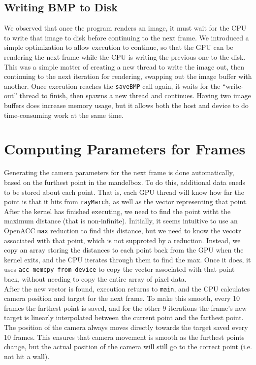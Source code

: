 \documentclass[11pt]{article}
\begin{document}
\subsection{Writing BMP to Disk}
We observed that once the program renders an image, it must wait for the CPU to write that image to disk before continuing to the next frame. We introduced a simple optimization to allow execution to continue, so that the GPU can be rendering the next frame while the CPU is writing the previous one to the disk. This was a simple matter of creating a new thread to write the image out, then continuing to the next iteration for rendering, swapping out the image buffer with another. Once execution reaches the \texttt{saveBMP} call again, it waits for the ``write-out'' thread to finish, then spawns a new thread and continues. Having two image buffers does increase memory usage, but it allows both the host and device to do time-consuming work at the same time.

\section{Computing Parameters for Frames}\label{Sec_AutomaticNav}
Generating the camera parameters for the next frame is done automatically, based on the furthest point in the mandelbox. To do this, additional data eneds to be stored about each point. That is, each GPU thread will know how far the point is that it hits from \texttt{rayMarch}, as well as the vector representing that point. After the kernel has finished executing, we need to find the point witht the maximum distance (that is non-infinite). Initially, it seems intuitive to use an OpenACC \texttt{max} reduction to find this distance, but we need to know the vecotr associated with that point, which is not supproted by a reduction. Instead, we copy an array storing the distances to each point back from the GPU when the kernel exits, and the CPU iterates through them to find the max. Once it does, it uses \texttt{acc\_memcpy\_from\_device} to copy the vector associated with that point back, without needing to copy the entire array of pixel data.\\

After the new vector is found, execution returns to \texttt{main}, and the CPU calculates camera position and target for the next frame. To make this smooth, every 10 frames the farthest point is saved, and for the other 9 iterations the frame's new target is linearly interpolated between the current point and the farthest point. The position of the camera always moves directly towards the target saved every 10 frames. This ensures that camera movement is smooth as the furthest points change, but the actual position of the camera will still go to the correct point (i.e. not hit a wall).
\end{document}
